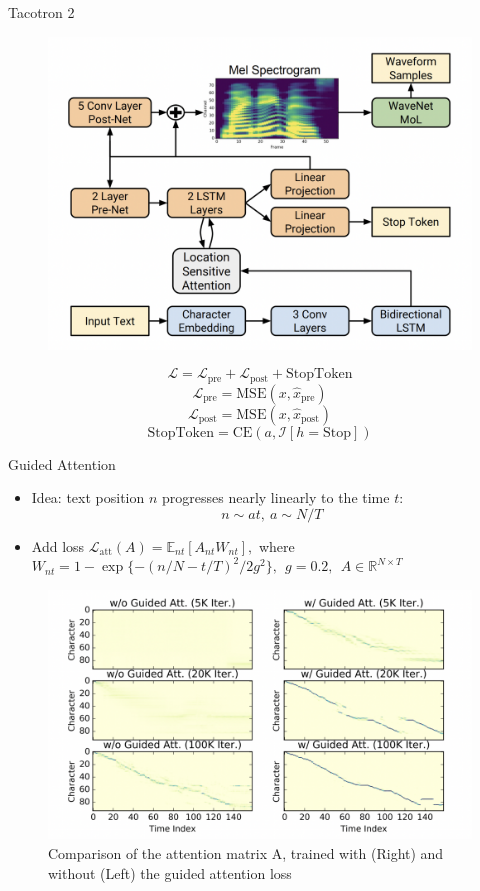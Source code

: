 \begin{frame}{Tacotron 2}
    \begin{figure}
    	\centering
    	\includegraphics[width=0.6\linewidth]{figs/tacotron2.png}
    \end{figure}
    
    $$\mathcal{L}=\mathcal{L}_{\mathrm{pre}}+\mathcal{L}_{\mathrm{post}}+\mathrm{StopToken}$$
    $$\mathcal{L}_{\mathrm{pre}}=\mathrm{MSE}(x,\hat{x}_{\mathrm{pre}})$$
    $$\mathcal{L}_{\mathrm{post}}=\mathrm{MSE}(x,\hat{x}_{\mathrm{post}})$$
    $$\mathrm{StopToken}=\mathrm{CE}(a,\mathcal{I}[h=\mathrm{Stop}])$$


\end{frame}
\begin{frame}{Guided Attention}
\begin{itemize}
    \item Idea: text position $n$ progresses nearly linearly to the time $t$: $$n \sim at, ~ a \sim N/T$$
    \item Add loss $\mathcal{L}_{\mathrm{att}}\left(A\right)=\mathbb{E}_{n t}[A_{n t}W_{n t}],$ where $W_{n t}=1-\exp\{-(n/N-t/T)^{2}/2g^{2}\}, ~~g = 0.2, ~~A \in \mathbb{R}^{N \times T}$
\end{itemize}
    \begin{figure}
    	\centering
    	\includegraphics[width=0.6\linewidth]{figs/guided_attention.png}
    	\caption{Comparison of the attention matrix A, trained with (Right) and without (Left) the guided attention loss }
    \end{figure}
    

\end{frame}
